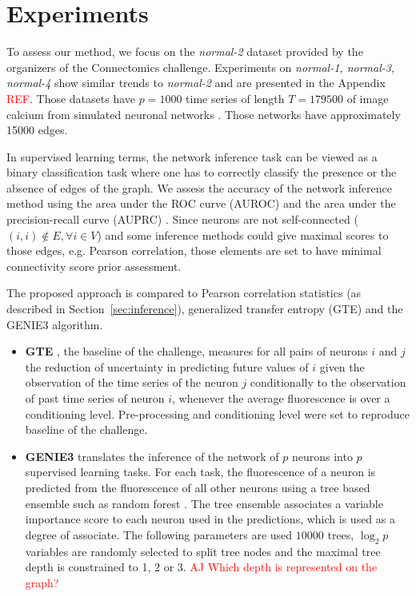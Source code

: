 \documentclass[wcp]{jmlr}
\begin{document}
\section{Experiments} \label{sec:results}

To assess our method, we focus on the \textit{normal-2} dataset
provided by the organizers of the Connectomics challenge. Experiments
on \textit{normal-1, normal-3, normal-4} show similar trends to
\textit{normal-2} and are presented in the Appendix \textcolor{red}{REF}.
Those datasets have $p=1000$ time series of length $T=179500$ of image
calcium from simulated neuronal networks \citep{stetter2012model}. Those
networks have approximately 15000 edges.

In supervised learning terms, the network inference task can be viewed as a
binary classification task where one has to correctly classify the presence or
the absence of edges of the graph. We assess the accuracy of the network
inference method using the area under the ROC curve (AUROC) and the area under
the precision-recall curve (AUPRC) \citep{schrynemackers2013protocols}. Since
neurons are not self-connected ($(i, i) \not \in E, \forall i \in V$) and some
inference methods could give maximal scores to those edges, e.g. Pearson
correlation, those elements are set to have minimal connectivity score prior
assessment.

The proposed approach is compared to Pearson correlation statistics (as
described in Section~\ref{sec:inference}), generalized transfer entropy (GTE)
and the GENIE3 algorithm.
\begin{itemize}
\item \textbf{GTE} \citep{stetter2012model}, the baseline of the challenge,
measures for all pairs of neurons $i$ and $j$ the reduction of uncertainty in
predicting future values of $i$ given the observation of the time series of the
neuron $j$ conditionally to the observation of past time series of neuron $i$,
whenever the average fluorescence is over a conditioning level. Pre-processing
and conditioning level were set to reproduce baseline of the challenge.

\item \textbf{GENIE3} \citep{huynhthu2010inferring} translates the inference
of the network of $p$ neurons into $p$ supervised learning tasks. For each
task, the fluorescence of a neuron is predicted from the fluorescence of all
other neurons using a tree based ensemble such as random forest
\citep{breiman2001random}. The tree ensemble associates a variable importance
score \citep{louppe2013understanding} to each neuron used in the predictions,
which is used as a degree of associate. The following parameters are used
$10000$ trees, $\log_2{p}$ variables are randomly selected to split tree nodes
and the maximal tree depth is constrained to 1, 2 or 3. \textcolor{red}{AJ Which
depth is represented on the graph?}
\end{itemize}
\end{document}
